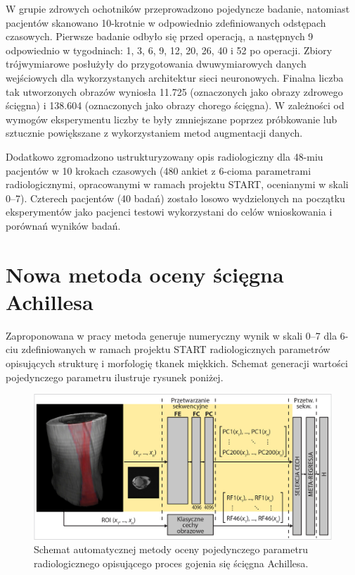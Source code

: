 W grupie zdrowych ochotników przeprowadzono pojedyncze badanie, natomiast pacjentów skanowano 10-krotnie w odpowiednio zdefiniowanych odstępach czasowych. Pierwsze badanie odbyło się przed operacją, a następnych 9 odpowiednio w tygodniach: 1, 3, 6, 9, 12, 20, 26, 40 i 52 po operacji. Zbiory trójwymiarowe posłużyły do przygotowania dwuwymiarowych danych wejściowych dla wykorzystanych architektur sieci neuronowych. Finalna liczba tak utworzonych obrazów wyniosła 11.725 (oznaczonych jako obrazy zdrowego ścięgna) i 138.604 (oznaczonych jako obrazy chorego ścięgna). W zależności od wymogów eksperymentu liczby te były zmniejszane poprzez próbkowanie lub sztucznie powiększane z wykorzystaniem metod augmentacji danych.

Dodatkowo zgromadzono ustrukturyzowany opis radiologiczny dla 48-miu pacjentów w 10 krokach czasowych (480 ankiet z 6-cioma parametrami radiologicznymi, opracowanymi w ramach projektu START, ocenianymi w skali 0--7). Czterech pacjentów (40 badań) zostało losowo wydzielonych na początku eksperymentów jako pacjenci testowi wykorzystani do celów wnioskowania i porównań wyników badań.

{\let\clearpage\relax\chapter*{Nowa metoda oceny ścięgna Achillesa}}

Zaproponowana w pracy metoda generuje numeryczny wynik w skali 0--7 dla 6-ciu zdefiniowanych w ramach projektu START radiologicznych parametrów opisujących strukturę i morfologię tkanek miękkich. Schemat generacji wartości pojedynczego parametru ilustruje rysunek poniżej. 
\begin{figure}[h!]
	\includegraphics[width=\textwidth]{figures/net.jpg}
	\caption{Schemat automatycznej metody oceny pojedynczego parametru radiologicznego opisującego proces gojenia się ścięgna Achillesa.} \label{fig:net}
\end{figure}

